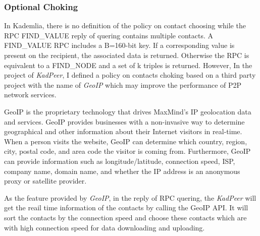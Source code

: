 \subsubsection{Optional Choking}
{
In Kademlia, there is no definition of the policy on contact choosing while the RPC FIND\_VALUE reply of quering contains multiple contacts.
A FIND\_VALUE RPC includes a B=160-bit key. If a corresponding value is present on the recipient, the associated data is returned. Otherwise the RPC is equivalent to a FIND\_NODE and a set of k triples is returned.
However, In the project of \emph{KadPeer}, I defined a policy on contacts choking based on a third party project with the name of \emph{GeoIP} which may improve the performance of P2P network services.

GeoIP is the proprietary technology that drives MaxMind's IP geolocation data and services. GeoIP provides businesses with a non-invasive way to determine geographical and other information about their Internet visitors in real-time. 
When a person visits the website, GeoIP can determine which country, region, city, postal code, and area code the visitor is coming from. 
Furthermore, GeoIP can provide information such as longitude/latitude, connection speed, ISP, company name, domain name, and whether the IP address is an anonymous proxy or satellite provider.

As the feature provided by \emph{GeoIP}, in the reply of RPC quering, the \emph{KadPeer} will get the reail time information of the contacts by calling the GeoIP API.
It will sort the contacts by the connection speed and choose these contacts which are with high connection speed for data downloading and uploading.

}

